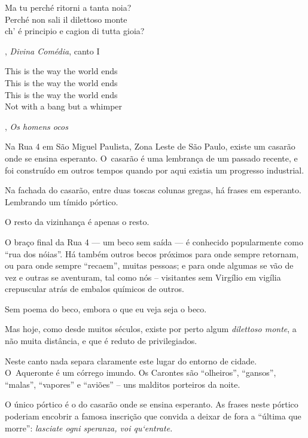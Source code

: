  

\epigraph{Ma tu perché ritorni a tanta noia?\\ Perché non sali il dilettoso
monte\\ ch' é principio e cagion di tutta gioia?}{, \textit{Divina Comédia}, canto I} 



\epigraph{This is the way the world ends\\ This is the way the world ends\\ This
is the way the world ends\\ Not with a bang but a whimper}{, \textit{Os homens ocos}} 

 


Na Rua 4 em São Miguel Paulista, Zona Leste de São Paulo, existe um
casarão onde se ensina esperanto. O~casarão é uma lembrança de um
passado recente, e foi construído em outros tempos quando por aqui
existia um progresso industrial.

Na fachada do casarão, entre duas toscas colunas gregas, há frases em
esperanto. Lembrando um tímido pórtico.

O resto da vizinhança é apenas o resto.

\asterisc{}

O braço final da Rua 4 --- um beco sem saída --- é conhecido
popularmente como ``rua dos nóias''. Há também outros becos próximos
para onde sempre retornam, ou para onde sempre ``recaem'', muitas
pessoas; e para onde algumas se vão de vez e outras se aventuram, tal
como nós -- visitantes sem Virgílio em vigília crepuscular atrás de
embalos químicos de outros.

Sem poema do beco, embora o que eu veja seja o beco.

Mas hoje, como desde muitos séculos, existe por perto algum
\emph{dilettoso monte}, a não muita distância, e que é reduto de
privilegiados.

\asterisc{}

Neste canto nada separa claramente este lugar do entorno de cidade. O~Aqueronte é um córrego imundo. Os Carontes são ``olheiros'', ``gansos'',
``malas'', ``vapores'' e ``aviões'' -- uns malditos porteiros da noite.

O único pórtico é o do casarão onde se ensina esperanto. As frases neste
pórtico poderiam encobrir a famosa inscrição que convida a deixar de
fora a ``última que morre'': \emph{lasciate ogni speranza, voi
qu`entrate.}

